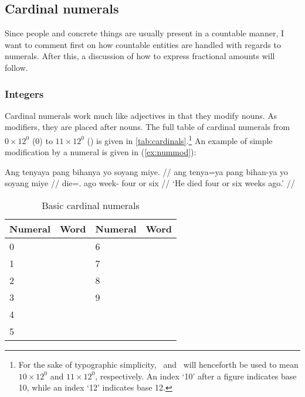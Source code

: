 \subsection{Cardinal numerals}

Since people and concrete things are usually present in a countable manner, I
want to comment first on how countable entities are handled with regards to
numerals. After this, a discussion of how to express fractional amounts will
follow.

\subsubsection{Integers}

Cardinal numerals work much like adjectives in that they modify nouns. As
modifiers, they are placed after nouns. The full table of cardinal numerals
from $0 \times 12^0$ (0) to $11 \times 12^0$ (\elv) is given in
\autoref{tab:cardinals}.\footnote{For the sake of typographic simplicity, \ten\
and \elv\ will henceforth be used to mean $10 \times 12^0$ and $11 \times
12^0$, respectively. An index `10' after a figure indicates base 10, while an
index `12' indicates base 12.} An example of simple modification by a numeral
is given in (\ref{ex:nummod}):

\ex\label{ex:nummod}
\begingl
	\gla Ang tenyaya pang bihanya yo soyang miye. //
	\glb ang tenya=ya pang bihan-ya yo soyang miye //
	\glc \AgtT{} die=\TsgM{}.\Top{} ago week-\Loc{} four or six //
	\glft `He died four or six weeks ago.' //
\endgl
\xe

\begin{table}[tp]\centering
\caption{Basic cardinal numerals}
\begin{tabu} to .75\linewidth {X[c] X[c] X[c] X[c]}
\toprule\tableheaderfont
Numeral
	& Word
	& Numeral
	& Word
	\\
\toprule

0
	& 
	& 6
	& 
	\\

1
	& 
	& 7
	& 
	\\
	
2
	& 
	& 8
	& 
	\\
	
3
	& 
	& 9
	& 
	\\

4
	& 
	& \ten
	& 
	\\

5
	& 
	& \elv
	& 
	\\

\bottomrule
\end{tabu}
\label{tab:cardinals}
\end{table}

